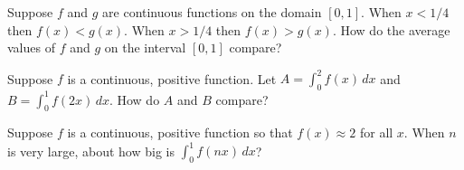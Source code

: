 \documentclass{ximera}
\newcommand{\recommendation}[1]{}
\begin{document}
\begin{shuffle}

\begin{problem}
  Suppose $f$ and $g$ are continuous functions on the domain $[0,1]$.  When $x < 1/4$ then $f(x) < g(x)$.  When $x > 1/4$ then $f(x) > g(x)$.  How do the average values of $f$ and $g$ on the interval $[0,1]$ compare?
  \begin{multipleChoice}
  \end{multipleChoice}
\end{problem}






\begin{problem}
  Suppose $f$ is a continuous, positive function.  Let $A = \int_0^2 f(x) \, dx$ and $B = \int_0^1 f(2x) \, dx$.  How do $A$ and $B$ compare?
  \begin{multipleChoice}
  \end{multipleChoice}
\end{problem}

\begin{problem}
  Suppose $f$ is a continuous, positive function so that $f(x) \approx 2$ for all $x$.  When $n$ is very large, about how big is $\int_0^1 f(nx) \, dx$?
  \begin{multipleChoice}
   \end{multipleChoice}
\end{problem}


\end{shuffle}
\end{document}
